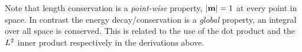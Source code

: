 Note that length conservation is a \emph{point-wise} property, \ie $\left|{\mathbf{m}} \right| = 1$ at every point in space. 
In contrast the energy decay/conservation is a \emph{global} property, \ie an integral over all space is conserved.
This is related to the use of the dot product and the $L^2$ inner product respectively in the derivations above.


